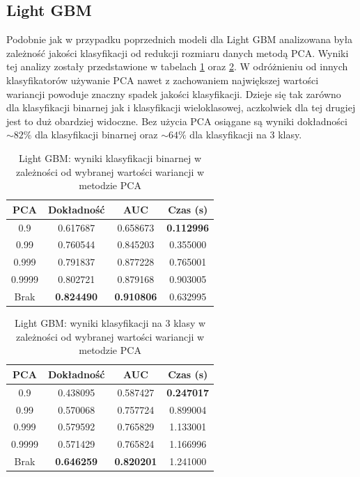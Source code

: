 \documentclass[a4paper, twoside, 11pt, openright]{article}
\begin{document}
\subsection{Light GBM}

Podobnie jak w przypadku poprzednich modeli dla Light GBM analizowana była zależność jakości klasyfikacji od redukcji rozmiaru danych metodą PCA. Wyniki tej analizy zostały przedstawione w tabelach \ref{tab:lgbm_pca_binary} oraz \ref{tab:lgbm_pca_discrete}. W odróżnieniu od innych klasyfikatorów używanie PCA nawet z zachowaniem największej wartości wariancji powoduje znaczny spadek jakości klasyfikacji. Dzieje się tak zarówno dla klasyfikacji binarnej jak i klasyfikacji wieloklasowej, aczkolwiek dla tej drugiej jest to duż obardziej widoczne. Bez użycia PCA osiągane są  wyniki dokładności $\sim 82\%$ dla klasyfikacji binarnej oraz $\sim 64\%$ dla klasyfikacji na 3 klasy.

\begin{table}[H]
    \centering
    \begin{tabular}{|c|c|c|c|}
    \hline
        \textbf{PCA} & \textbf{Dokładność} & \textbf{AUC} & \textbf{Czas (s)} \\ \hline
0.9                &  0.617687 &  0.658673 &    \textbf{0.112996} \\ \hline
0.99               &  0.760544 &  0.845203 &    0.355000 \\ \hline
0.999    &  0.791837 &  0.877228 &    0.765001 \\ \hline
0.9999             &  0.802721 &  0.879168 &    0.903005 \\ \hline
Brak                &  \textbf{0.824490} &  \textbf{0.910806} &    0.632995 \\ \hline
    \end{tabular}
    \caption{Light GBM: wyniki klasyfikacji binarnej w zależności od wybranej wartości wariancji w metodzie PCA}
    \label{tab:lgbm_pca_binary}
\end{table}

\begin{table}[H]
    \centering
    \begin{tabular}{|c|c|c|c|}
    \hline
        \textbf{PCA} & \textbf{Dokładność} & \textbf{AUC} & \textbf{Czas (s)} \\ \hline
0.9                &  0.438095 &  0.587427 &    \textbf{0.247017} \\  \hline
0.99               &  0.570068 &  0.757724 &    0.899004 \\ \hline
0.999 &  0.579592 &  0.765829 &    1.133001 \\ \hline
0.9999             &  0.571429 &  0.765824 &    1.166996 \\ \hline
Brak                &  \textbf{0.646259} &  \textbf{0.820201} &    1.241000 \\ \hline
    \end{tabular}
    \caption{Light GBM: wyniki klasyfikacji na 3 klasy w zależności od wybranej wartości wariancji w metodzie PCA}
    \label{tab:lgbm_pca_discrete}
\end{table}
\end{document}
